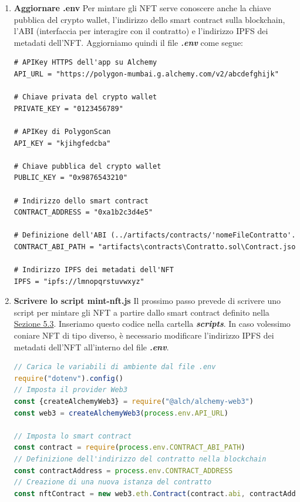 \documentclass[12pt]{report}
\begin{document}
\begin{enumerate}[topsep=5pt, itemsep=0pt]
\item \textbf{Aggiornare .env}\newline
Per mintare gli NFT serve conoscere anche la chiave pubblica del crypto wallet, l'indirizzo dello smart contract sulla blockchain, l'ABI (interfaccia per interagire con il contratto) e l'indirizzo IPFS dei metadati dell'NFT.\newline
Aggiorniamo quindi il file \textit{\textbf{.env}} come segue:
\begin{lstlisting}[language=HTML, numbers=none, aboveskip=2pt]
# APIKey HTTPS dell'app su Alchemy
API_URL = "https://polygon-mumbai.g.alchemy.com/v2/abcdefghijk"

# Chiave privata del crypto wallet
PRIVATE_KEY = "0123456789"

# APIKey di PolygonScan
API_KEY = "kjihgfedcba"

# Chiave pubblica del crypto wallet
PUBLIC_KEY = "0x9876543210"

# Indirizzo dello smart contract
CONTRACT_ADDRESS = "0xa1b2c3d4e5"

# Definizione dell'ABI (../artifacts/contracts/'nomeFileContratto'.sol/'nomeContratto'.json)
CONTRACT_ABI_PATH = "artifacts\contracts\Contratto.sol\Contract.json"

# Indirizzo IPFS dei metadati dell'NFT
IPFS = "ipfs://lmnopqrstuvwxyz"
\end{lstlisting}\newpage

\item \textbf{Scrivere lo script mint-nft.js}\newline
Il prossimo passo prevede di scrivere uno script per mintare gli NFT a partire dallo smart contract definito nella \hyperref[sec:contratto]{Sezione 5.3}.\newline
Inseriamo questo codice nella cartella \textit{\textbf{scripts}}.\newline
In caso volessimo coniare NFT di tipo diverso, è necessario modificare l'indirizzo IPFS dei metadati dell'NFT all'interno del file \textit{\textbf{.env}}.
\begin{lstlisting}[language=JavaScript, aboveskip=2pt]
// Carica le variabili di ambiente dal file .env
require("dotenv").config()
// Imposta il provider Web3
const {createAlchemyWeb3} = require("@alch/alchemy-web3")
const web3 = createAlchemyWeb3(process.env.API_URL)

// Imposta lo smart contract
const contract = require(process.env.CONTRACT_ABI_PATH)
// Definizione dell'indirizzo del contratto nella blockchain
const contractAddress = process.env.CONTRACT_ADDRESS
// Creazione di una nuova istanza del contratto
const nftContract = new web3.eth.Contract(contract.abi, contractAddress)


\end{lstlisting}
\end{enumerate}
\end{document}
